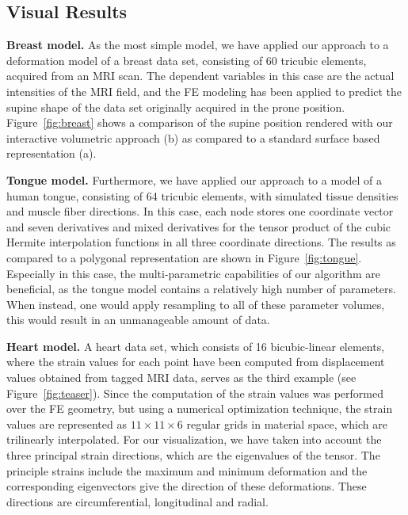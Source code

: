 \documentclass[review,journal]{vgtc}         %
\begin{document}
\subsection{Visual Results}

\noindent \textbf{Breast model.} As the most simple model, we have applied our approach to a deformation model of a breast data set, consisting of 60 tricubic elements, acquired from an MRI scan. The dependent variables in this case are the actual intensities of the MRI field, and the FE modeling has been applied to predict the supine shape of the data set originally acquired in the prone position. Figure~\ref{fig:breast} shows a comparison of the supine position rendered with our interactive volumetric approach (b) as compared to a standard surface based representation (a).

\noindent \textbf{Tongue model.} Furthermore, we have applied our approach to a model of a human tongue, consisting of 64 tricubic elements, with simulated tissue densities and muscle fiber directions. In this case, each node stores one coordinate vector and seven derivatives and mixed derivatives for the tensor product of the cubic Hermite interpolation functions in all three coordinate directions. The results as compared to a polygonal representation are shown in Figure~\ref{fig:tongue}. Especially in this case, the multi-parametric capabilities of our algorithm are beneficial, as the tongue model contains a relatively high number of parameters. When instead, one would apply resampling to all of these parameter volumes, this would result in an unmanageable amount of data.

\noindent \textbf{Heart model.} A heart data set, which consists of 16 bicubic-linear elements,  where the strain values for each point have been computed from displacement values obtained from tagged MRI data, serves as the third example (see Figure~\ref{fig:teaser}). Since the computation of the strain values was performed over the FE geometry, but using a numerical optimization technique, the strain values are represented as $11 \times 11 \times 6$ regular grids in material space, which are trilinearly interpolated. For our visualization, we have taken into account the three principal strain directions, which are the eigenvalues of the tensor. The principle strains include the maximum and minimum deformation and the corresponding eigenvectors give the direction of these deformations. These directions are circumferential, longitudinal and radial.
\end{document}
